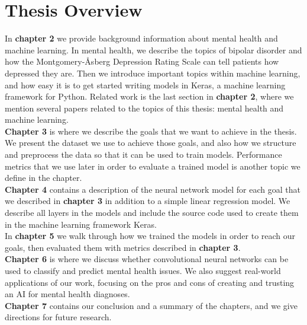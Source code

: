 \section{Thesis Overview}
In \textbf{chapter 2} we provide background information about mental health and machine learning. In mental health, we describe the topics of bipolar disorder and how the Montgomery-Åsberg Depression Rating Scale can tell patients how depressed they are. Then we introduce important topics within machine learning, and how easy it is to get started writing models in Keras, a machine learning framework for Python. Related work is the last section in \textbf{chapter 2}, where we mention several papers related to the topics of this thesis: mental health and machine learning. \\

\noindent \textbf{Chapter 3} is where we describe the goals that we want to achieve in the thesis. We present the dataset we use to achieve those goals, and also how we structure and preprocess the data so that it can be used to train models. Performance metrics that we use later in order to evaluate a trained model is another topic we define in the chapter.\\

\noindent \textbf{Chapter 4} contains a description of the neural network model for each goal that we described in \textbf{chapter 3} in addition to a simple linear regression model. We describe all layers in the models and include the source code used to create them in the machine learning framework Keras. \\

\noindent In \textbf{chapter 5} we walk through how we trained the models in order to reach our goals, then evaluated them with metrics described in \textbf{chapter 3}. \\

\noindent \textbf{Chapter 6} is where we discuss whether convolutional neural networks can be used to classify and predict mental health issues. We also suggest real-world applications of our work, focusing on the pros and cons of creating and trusting an AI for mental health diagnoses. \\

\noindent \textbf{Chapter 7} contains our conclusion and a summary of the chapters, and we give directions for future research.